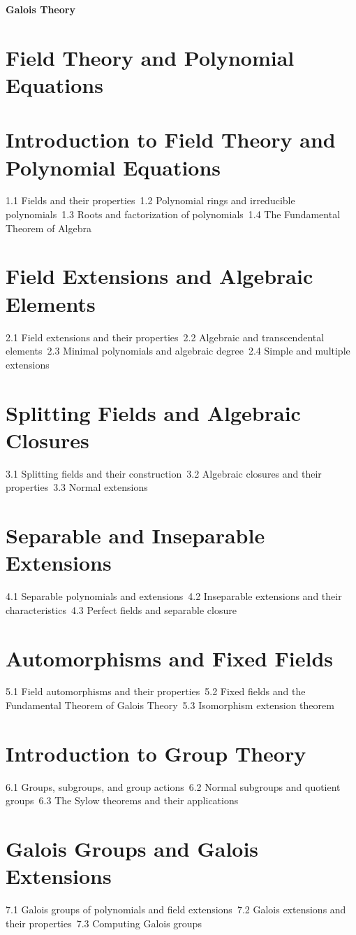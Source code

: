 {\LARGE \bf{Galois Theory}}
\section{Field Theory and Polynomial Equations}
\section{Introduction to Field Theory and Polynomial Equations}
1.1 Fields and their properties\
1.2 Polynomial rings and irreducible polynomials\
1.3 Roots and factorization of polynomials\
1.4 The Fundamental Theorem of Algebra\
\section{Field Extensions and Algebraic Elements}
2.1 Field extensions and their properties\
2.2 Algebraic and transcendental elements\
2.3 Minimal polynomials and algebraic degree\
2.4 Simple and multiple extensions\
\section{Splitting Fields and Algebraic Closures}
3.1 Splitting fields and their construction\
3.2 Algebraic closures and their properties\
3.3 Normal extensions\
\section{Separable and Inseparable Extensions}
4.1 Separable polynomials and extensions\
4.2 Inseparable extensions and their characteristics\
4.3 Perfect fields and separable closure\
\section{Automorphisms and Fixed Fields}
5.1 Field automorphisms and their properties\
5.2 Fixed fields and the Fundamental Theorem of Galois Theory\
5.3 Isomorphism extension theorem\
\section{Introduction to Group Theory}
6.1 Groups, subgroups, and group actions\
6.2 Normal subgroups and quotient groups\
6.3 The Sylow theorems and their applications\
\section{Galois Groups and Galois Extensions}
7.1 Galois groups of polynomials and field extensions\
7.2 Galois extensions and their properties\
7.3 Computing Galois groups\
